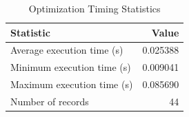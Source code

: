 
\begin{table}[h!]
\centering
\begin{tabular}{l r}
\hline
Statistic & Value \\
\hline
Average execution time (s) & 0.025388 \\
Minimum execution time (s) & 0.009041 \\
Maximum execution time (s) & 0.085690 \\
Number of records & 44 \\
\hline
\end{tabular}
\caption{Optimization Timing Statistics}
\end{table}
